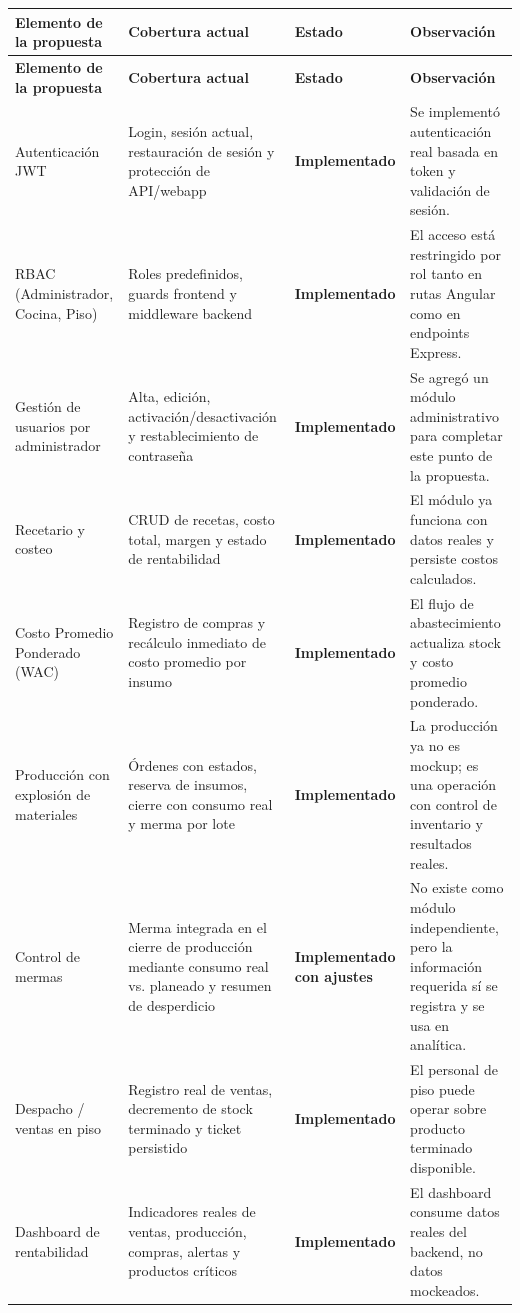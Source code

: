 \documentclass[12pt,letterpaper]{article}
\newcommand{\ok}{\textbf{Implementado}}
\newcommand{\adj}{\textbf{Implementado con ajustes}}
\begin{document}
\renewcommand{\arraystretch}{1.25}
\begin{longtable}{|p{3.5cm}|p{3.2cm}|p{2.4cm}|p{5.7cm}|}
\hline
\textbf{Elemento de la propuesta} & \textbf{Cobertura actual} & \textbf{Estado} & \textbf{Observación} \\
\hline
\endfirsthead

\hline
\textbf{Elemento de la propuesta} & \textbf{Cobertura actual} & \textbf{Estado} & \textbf{Observación} \\
\hline
\endhead

Autenticación JWT & Login, sesión actual, restauración de sesión y protección de API/webapp & \ok & Se implementó autenticación real basada en token y validación de sesión. \\
\hline
RBAC (Administrador, Cocina, Piso) & Roles predefinidos, guards frontend y middleware backend & \ok & El acceso está restringido por rol tanto en rutas Angular como en endpoints Express. \\
\hline
Gestión de usuarios por administrador & Alta, edición, activación/desactivación y restablecimiento de contraseña & \ok & Se agregó un módulo administrativo para completar este punto de la propuesta. \\
\hline
Recetario y costeo & CRUD de recetas, costo total, margen y estado de rentabilidad & \ok & El módulo ya funciona con datos reales y persiste costos calculados. \\
\hline
Costo Promedio Ponderado (WAC) & Registro de compras y recálculo inmediato de costo promedio por insumo & \ok & El flujo de abastecimiento actualiza stock y costo promedio ponderado. \\
\hline
Producción con explosión de materiales & Órdenes con estados, reserva de insumos, cierre con consumo real y merma por lote & \ok & La producción ya no es mockup; es una operación con control de inventario y resultados reales. \\
\hline
Control de mermas & Merma integrada en el cierre de producción mediante consumo real vs. planeado y resumen de desperdicio & \adj & No existe como módulo independiente, pero la información requerida sí se registra y se usa en analítica. \\
\hline
Despacho / ventas en piso & Registro real de ventas, decremento de stock terminado y ticket persistido & \ok & El personal de piso puede operar sobre producto terminado disponible. \\
\hline
Dashboard de rentabilidad & Indicadores reales de ventas, producción, compras, alertas y productos críticos & \ok & El dashboard consume datos reales del backend, no datos mockeados. \\

\end{longtable}
\end{document}
